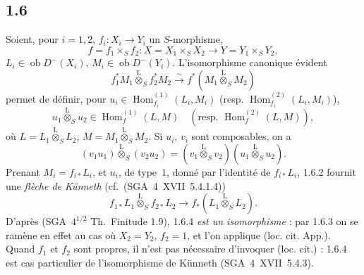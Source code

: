\documentclass[11pt]{article}
\DeclareMathOperator{\Hom}{Hom}
\newcommand{\ob}{\operatorname{ob}}
\providecommand{\Hom}{\operatorname{Hom}}
\providecommand{\ob}{\operatorname{ob}}
\providecommand{\Hom}{\operatorname{Hom}}
\begin{document}
\subsection*{1.6}
Soient, pour $i=1,2$, $f_i:X_i\to Y_i$ un $S$-morphisme,
\[
f=f_1\times_S f_2:X=X_1\times_S X_2\to Y=Y_1\times_S Y_2,
\]
$L_i\in\ob D^{-}(X_i)$, $M_i\in\ob D^{-}(Y_i)$. L'isomorphisme canonique évident
\begin{equation}\tag{1.6.1}
f_1^{*}M_1\overset{\mathrm{L}}{\otimes}_{S}f_2^{*}M_2\xrightarrow{\sim}f^{*}(M_1\overset{\mathrm{L}}{\otimes}_{S}M_2)
\end{equation}
permet de définir, pour $u_i\in\Hom_{f_i}^{(1)}(L_i,M_i)$ (resp. $\Hom_{f_i}^{(2)}(L_i,M_i)$),
\begin{equation}\tag{1.6.2}
u_1\overset{\mathrm{L}}{\otimes}_{S}u_2\in\Hom_{f}^{(1)}(L,M)\quad(\text{resp. }\Hom_f^{(2)}(L,M)),
\end{equation}
où $L=L_1\overset{\mathrm{L}}{\otimes}_{S}L_2$, $M=M_1\overset{\mathrm{L}}{\otimes}_{S}M_2$. Si $u_i$, $v_i$ sont composables, on a
\begin{equation}\tag{1.6.3}
(v_1u_1)\overset{\mathrm{L}}{\otimes}_{S}(v_2u_2)=(v_1\overset{\mathrm{L}}{\otimes}_{S}v_2)(u_1\overset{\mathrm{L}}{\otimes}_{S}u_2).
\end{equation}
Prenant $M_i=f_{i*}L_i$, et $u_i$, de type~1, donné par l'identité de $f_{i*}L_i$, 1.6.2 fournit une \emph{flèche de Künneth} (cf.~(SGA~4~XVII~5.4.1.4))
\begin{equation}\tag{1.6.4}
f_{1*}L_1\overset{\mathrm{L}}{\otimes}_{S}f_{2*}L_2\longrightarrow f_{*}(L_1\overset{\mathrm{L}}{\otimes}_{S}L_2).
\end{equation}
D'après (SGA~$4^{1/2}$ Th.~Finitude 1.9), 1.6.4 \emph{est un isomorphisme} : par 1.6.3 on se ramène en effet au cas où $X_2=Y_2$, $f_2=1$, et l'on applique (loc. cit. App.). Quand $f_1$ et $f_2$ sont propres, il n'est pas nécessaire d'invoquer (loc. cit.) : 1.6.4 est cas particulier de l'isomorphisme de Künneth (SGA~4~XVII~5.4.3).
\end{document}
